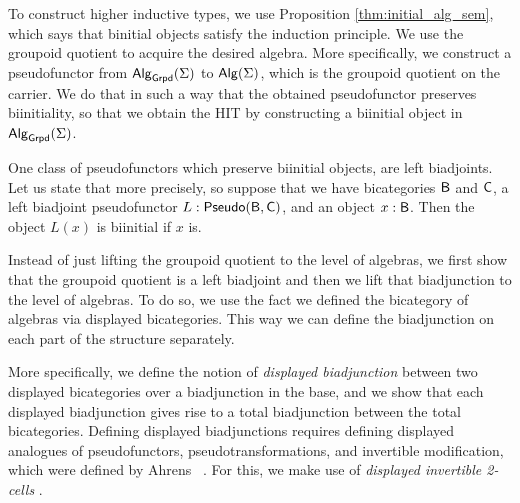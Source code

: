 To construct higher inductive types, we use Proposition \ref{thm:initial_alg_sem}, which says that binitial objects satisfy the induction principle.
We use the groupoid quotient to acquire the desired algebra.
More specifically, we construct a pseudofunctor from $\mathsf{Alg}_{\mathsf{Grpd}}(\Sigma)$ to $\mathsf{Alg}(\Sigma)$,
which is the groupoid quotient on the carrier.
We do that in such a way that the obtained pseudofunctor preserves biinitiality,
so that we obtain the HIT by constructing a biinitial object in $\mathsf{Alg}_{\mathsf{Grpd}}(\Sigma)$.

One class of pseudofunctors which preserve biinitial objects, are left biadjoints.
Let us state that more precisely, so suppose that we have bicategories $\mathsf{B}$ and $\mathsf{C}$, a left biadjoint pseudofunctor $L : \mathsf{Pseudo}(\mathsf{B}, \mathsf{C})$, and an object $x : \mathsf{B}$.
Then the object $L(x)$ is biinitial if $x$ is.

Instead of just lifting the groupoid quotient to the level of algebras,
we first show that the groupoid quotient is a left biadjoint and then we lift that biadjunction to the level of algebras.
To do so, we use the fact we defined the bicategory of algebras via displayed bicategories.
This way we can define the biadjunction on each part of the structure separately.

More specifically, we define the notion of \emph{displayed biadjunction} between two displayed bicategories over a biadjunction in the base,
and we show that each displayed biadjunction gives rise to a total biadjunction between the total bicategories.
Defining displayed biadjunctions requires defining displayed analogues of pseudofunctors, pseudotransformations, and invertible modification,
which were defined by Ahrens \etal \ \cite{bicatjournal}.
For this, we make use of \emph{displayed invertible 2-cells} \cite{bicatjournal}.

